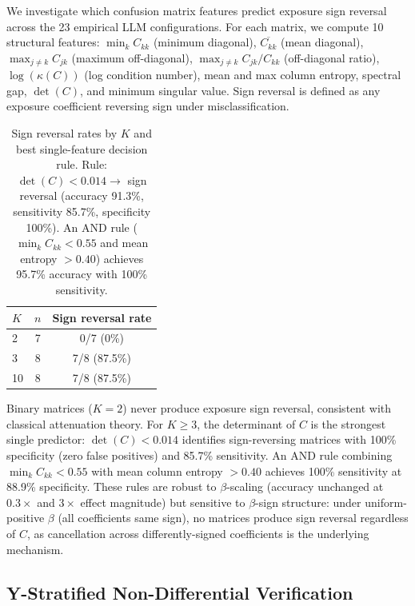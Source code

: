 We investigate which confusion matrix features predict exposure sign reversal across the 23 empirical LLM configurations. For each matrix, we compute 10 structural features: $\min_k C_{kk}$ (minimum diagonal), $\overline{C_{kk}}$ (mean diagonal), $\max_{j \neq k} C_{jk}$ (maximum off-diagonal), $\max_{j \neq k} C_{jk}/C_{kk}$ (off-diagonal ratio), $\log(\kappa(C))$ (log condition number), mean and max column entropy, spectral gap, $\det(C)$, and minimum singular value. Sign reversal is defined as any exposure coefficient reversing sign under misclassification.

\begin{table}[h]
\centering
\small
\caption{Sign reversal rates by $K$ and best single-feature decision rule. Rule: $\det(C) < 0.014 \to$ sign reversal (accuracy 91.3\%, sensitivity 85.7\%, specificity 100\%). An AND rule ($\min_k C_{kk} < 0.55$ and mean entropy $> 0.40$) achieves 95.7\% accuracy with 100\% sensitivity.}
\label{tab:sign_determinants}
\begin{tabular}{lcc}
\toprule
$K$ & $n$ & Sign reversal rate \\
\midrule
2 & 7 & 0/7 (0\%) \\
3 & 8 & 7/8 (87.5\%) \\
10 & 8 & 7/8 (87.5\%) \\
\bottomrule
\end{tabular}
\end{table}

Binary matrices ($K{=}2$) never produce exposure sign reversal, consistent with classical attenuation theory. For $K \geq 3$, the determinant of $C$ is the strongest single predictor: $\det(C) < 0.014$ identifies sign-reversing matrices with 100\% specificity (zero false positives) and 85.7\% sensitivity. An AND rule combining $\min_k C_{kk} < 0.55$ with mean column entropy $> 0.40$ achieves 100\% sensitivity at 88.9\% specificity. These rules are robust to $\beta$-scaling (accuracy unchanged at $0.3{\times}$ and $3{\times}$ effect magnitude) but sensitive to $\beta$-sign structure: under uniform-positive $\beta$ (all coefficients same sign), no matrices produce sign reversal regardless of $C$, as cancellation across differently-signed coefficients is the underlying mechanism.

\subsection{Y-Stratified Non-Differential Verification}
\label{sec:y_stratified_test}


